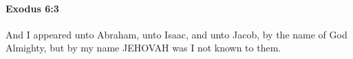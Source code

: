 
		\paragraph{Exodus 6:3} %
			\label{EXODUS-6-3}

			And I appeared unto Abraham, unto Isaac, and unto Jacob, by the name of God Almighty, but by my name JEHOVAH was I not known to them.


